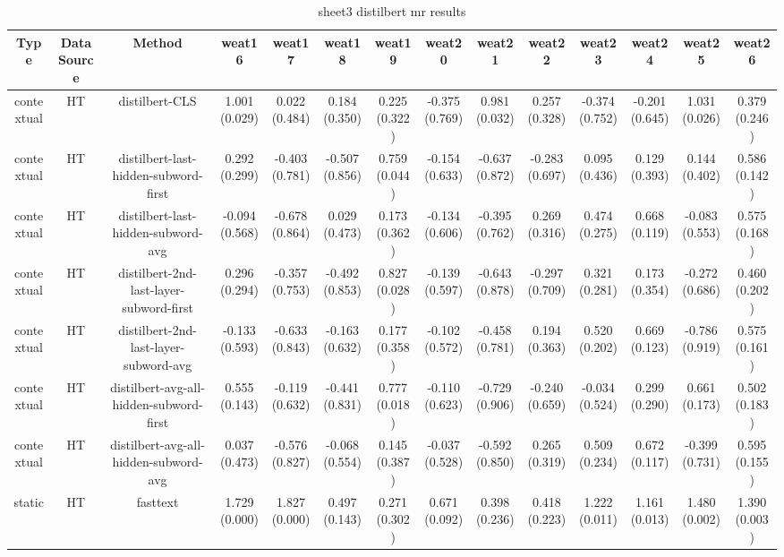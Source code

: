 \begin{sidewaystable}[htb]
    \centering
    \caption{sheet3 distilbert mr results}
    \label{appendix_tab:sheet3_distilbert_mr_results}
    \small
    \begin{tabular}{@{}cccccccccccccc@{}}
        \toprule
        Type & DataSource & Method & weat16 & weat17 & weat18 & weat19 & weat20 & weat21 & weat22 & weat23 & weat24 & weat25 & weat26 \\
        \midrule
        contextual & HT & distilbert-CLS & 1.001 (0.029) & 0.022 (0.484) & 0.184 (0.350) & 0.225 (0.322) & -0.375 (0.769) & 0.981 (0.032) & 0.257 (0.328) & -0.374 (0.752) & -0.201 (0.645) & 1.031 (0.026) & 0.379 (0.246) \\
        contextual & HT & distilbert-last-hidden-subword-first & 0.292 (0.299) & -0.403 (0.781) & -0.507 (0.856) & 0.759 (0.044) & -0.154 (0.633) & -0.637 (0.872) & -0.283 (0.697) & 0.095 (0.436) & 0.129 (0.393) & 0.144 (0.402) & 0.586 (0.142) \\
        contextual & HT & distilbert-last-hidden-subword-avg & -0.094 (0.568) & -0.678 (0.864) & 0.029 (0.473) & 0.173 (0.362) & -0.134 (0.606) & -0.395 (0.762) & 0.269 (0.316) & 0.474 (0.275) & 0.668 (0.119) & -0.083 (0.553) & 0.575 (0.168) \\
        contextual & HT & distilbert-2nd-last-layer-subword-first & 0.296 (0.294) & -0.357 (0.753) & -0.492 (0.853) & 0.827 (0.028) & -0.139 (0.597) & -0.643 (0.878) & -0.297 (0.709) & 0.321 (0.281) & 0.173 (0.354) & -0.272 (0.686) & 0.460 (0.202) \\
        contextual & HT & distilbert-2nd-last-layer-subword-avg & -0.133 (0.593) & -0.633 (0.843) & -0.163 (0.632) & 0.177 (0.358) & -0.102 (0.572) & -0.458 (0.781) & 0.194 (0.363) & 0.520 (0.202) & 0.669 (0.123) & -0.786 (0.919) & 0.575 (0.161) \\
        contextual & HT & distilbert-avg-all-hidden-subword-first & 0.555 (0.143) & -0.119 (0.632) & -0.441 (0.831) & 0.777 (0.018) & -0.110 (0.623) & -0.729 (0.906) & -0.240 (0.659) & -0.034 (0.524) & 0.299 (0.290) & 0.661 (0.173) & 0.502 (0.183) \\
        contextual & HT & distilbert-avg-all-hidden-subword-avg & 0.037 (0.473) & -0.576 (0.827) & -0.068 (0.554) & 0.145 (0.387) & -0.037 (0.528) & -0.592 (0.850) & 0.265 (0.319) & 0.509 (0.234) & 0.672 (0.117) & -0.399 (0.731) & 0.595 (0.155) \\
        static & HT & fasttext & 1.729 (0.000) & 1.827 (0.000) & 0.497 (0.143) & 0.271 (0.302) & 0.671 (0.092) & 0.398 (0.236) & 0.418 (0.223) & 1.222 (0.011) & 1.161 (0.013) & 1.480 (0.002) & 1.390 (0.003) \\

\end{tabular}
\end{sidewaystable}

